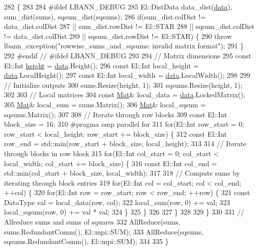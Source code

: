 \begin{DoxyCode}
282                                                 \{
283 
284 \textcolor{preprocessor}{#ifdef LBANN\_DEBUG}
285   El::DistData data\_dist(\hyperlink{namespacelbann_1_1cnpy__utils_a9ac86d96ccb1f8b4b2ea16441738781f}{data}), sum\_dist(sums), sqsum\_dist(sqsums);
286   \textcolor{keywordflow}{if}(sum\_dist.colDist != data\_dist.colDist
287       || sum\_dist.rowDist != El::STAR
288       || sqsum\_dist.colDist != data\_dist.colDist
289       || sqsum\_dist.rowDist != El::STAR) \{
290     \textcolor{keywordflow}{throw} lbann\_exception(\textcolor{stringliteral}{"rowwise\_sums\_and\_sqsums: invalid matrix format"});
291   \}
292 \textcolor{preprocessor}{#endif // #ifdef LBANN\_DEBUG}
293 
294   \textcolor{comment}{// Matrix dimensions}
295   \textcolor{keyword}{const} El::Int \hyperlink{structlayer__header_ad986e4b92e5b455e066fd349725c6bd9}{height} = \hyperlink{namespacelbann_1_1cnpy__utils_a9ac86d96ccb1f8b4b2ea16441738781f}{data}.Height();
296   \textcolor{keyword}{const} El::Int local\_height = \hyperlink{namespacelbann_1_1cnpy__utils_a9ac86d96ccb1f8b4b2ea16441738781f}{data}.LocalHeight();
297   \textcolor{keyword}{const} El::Int local\_width = \hyperlink{namespacelbann_1_1cnpy__utils_a9ac86d96ccb1f8b4b2ea16441738781f}{data}.LocalWidth();
298 
299   \textcolor{comment}{// Initialize outputs}
300   sums.Resize(height, 1);
301   sqsums.Resize(height, 1);
302 
303   \textcolor{comment}{// Local matrices}
304   \textcolor{keyword}{const} \hyperlink{base_8hpp_a68f11fdc31b62516cb310831bbe54d73}{Mat}& local\_data = \hyperlink{namespacelbann_1_1cnpy__utils_a9ac86d96ccb1f8b4b2ea16441738781f}{data}.LockedMatrix();
305   \hyperlink{base_8hpp_a68f11fdc31b62516cb310831bbe54d73}{Mat}& local\_sum = sums.Matrix();
306   \hyperlink{base_8hpp_a68f11fdc31b62516cb310831bbe54d73}{Mat}& local\_sqsum = sqsums.Matrix();
307 
308   \textcolor{comment}{// Iterate through row blocks}
309   \textcolor{keyword}{const} El::Int block\_size = 16;
310 \textcolor{preprocessor}{  #pragma omp parallel for}
311   \textcolor{keywordflow}{for}(El::Int row\_start = 0; row\_start < local\_height; row\_start += block\_size) \{
312     \textcolor{keyword}{const} El::Int row\_end = std::min(row\_start + block\_size, local\_height);
313 
314     \textcolor{comment}{// Iterate through blocks in row block}
315     \textcolor{keywordflow}{for}(El::Int col\_start = 0; col\_start < local\_width; col\_start += block\_size) \{
316       \textcolor{keyword}{const} El::Int col\_end = std::min(col\_start + block\_size, local\_width);
317 
318       \textcolor{comment}{// Compute sums by iterating through block entries}
319       \textcolor{keywordflow}{for}(El::Int col = col\_start; col < col\_end; ++col) \{
320         \textcolor{keywordflow}{for}(El::Int row = row\_start; row < row\_end; ++row) \{
321           \textcolor{keyword}{const} DataType val = local\_data(row, col);
322           local\_sum(row, 0) += val;
323           local\_sqsum(row, 0) += val * val;
324         \}
325       \}
326 
327     \}
328 
329   \}
330 
331   \textcolor{comment}{// Allreduce sums and sums of squares}
332   AllReduce(sums, sums.RedundantComm(), El::mpi::SUM);
333   AllReduce(sqsums, sqsums.RedundantComm(), El::mpi::SUM);
334 
335 \}
\end{DoxyCode}

